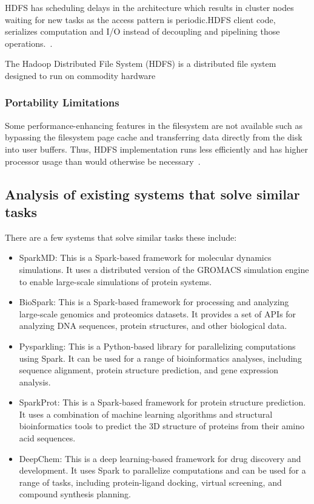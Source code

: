 \documentclass[]{final_report}
\begin{document}
HDFS has scheduling delays in the architecture which results in cluster nodes waiting for new tasks as the access pattern is periodic.HDFS client code, serializes computation and I/O instead of decoupling and pipelining those operations.~\cite{shafer_hadoop_2010}.

\begin{definition}[HDFS]
    The Hadoop Distributed File System (HDFS) is a distributed file system designed to run on commodity hardware
\end{definition}

\subsubsection{Portability Limitations}
Some performance-enhancing features in the filesystem are not available such as bypassing the filesystem page cache and transferring data directly from the disk into user buffers. Thus, HDFS implementation runs less efficiently and has higher processor usage than would otherwise be necessary~\cite{shafer_hadoop_2010}.
\clearpage

\subsection{Analysis of existing systems that solve similar tasks}
There are a few systems that solve similar tasks these include:

\begin{itemize}
    \item SparkMD: This is a Spark-based framework for molecular dynamics simulations. It uses a distributed version of the GROMACS simulation engine to enable large-scale simulations of protein systems.
    \item BioSpark: This is a Spark-based framework for processing and analyzing large-scale genomics and proteomics datasets. It provides a set of APIs for analyzing DNA sequences, protein structures, and other biological data.
    \item Pysparkling: This is a Python-based library for parallelizing computations using Spark. It can be used for a range of bioinformatics analyses, including sequence alignment, protein structure prediction, and gene expression analysis.
    \item SparkProt: This is a Spark-based framework for protein structure prediction. It uses a combination of machine learning algorithms and structural bioinformatics tools to predict the 3D structure of proteins from their amino acid sequences.
    \item DeepChem: This is a deep learning-based framework for drug discovery and development. It uses Spark to parallelize computations and can be used for a range of tasks, including protein-ligand docking, virtual screening, and compound synthesis planning.
\end{itemize}
\end{document}
